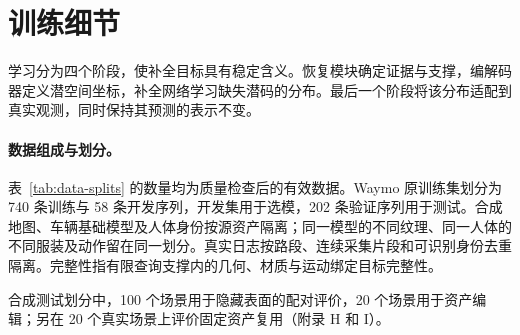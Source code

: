 \section{训练细节}
\label{sec:supp-training}

学习分为四个阶段，使补全目标具有稳定含义。恢复模块确定证据与支撑，编解码器定义潜空间坐标，补全网络学习缺失潜码的分布。最后一个阶段将该分布适配到真实观测，同时保持其预测的表示不变。

\paragraph{数据组成与划分。}
表~\ref{tab:data-splits} 的数量均为质量检查后的有效数据。Waymo 原训练集划分为 740 条训练与 58 条开发序列，开发集用于选模，202 条验证序列用于测试。合成地图、车辆基础模型及人体身份按源资产隔离；同一模型的不同纹理、同一人体的不同服装及动作留在同一划分。真实日志按路段、连续采集片段和可识别身份去重隔离。完整性指有限查询支撑内的几何、材质与运动绑定目标完整性。

合成测试划分中，100 个场景用于隐藏表面的配对评价，20 个场景用于资产编辑；另在 20 个真实场景上评价固定资产复用（附录 H 和 I）。

